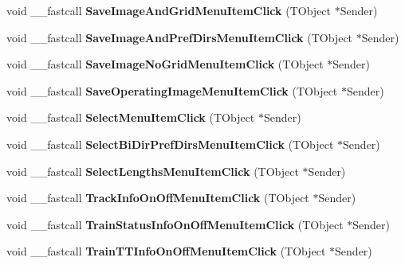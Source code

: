 \begin{DoxyCompactItemize}
void \+\_\+\+\_\+fastcall {\bfseries Save\+Image\+And\+Grid\+Menu\+Item\+Click} (T\+Object $\ast$Sender)
\item 
\mbox{\label{class_t_interface_ab73377784e302350bcc4f1fed4f8d90a}} 
void \+\_\+\+\_\+fastcall {\bfseries Save\+Image\+And\+Pref\+Dirs\+Menu\+Item\+Click} (T\+Object $\ast$Sender)
\item 
\mbox{\label{class_t_interface_a69b645fe4cc36d0bea7de3fca553bd6a}} 
void \+\_\+\+\_\+fastcall {\bfseries Save\+Image\+No\+Grid\+Menu\+Item\+Click} (T\+Object $\ast$Sender)
\item 
\mbox{\label{class_t_interface_a4d75015545313004ffd5022c020f4edf}} 
void \+\_\+\+\_\+fastcall {\bfseries Save\+Operating\+Image\+Menu\+Item\+Click} (T\+Object $\ast$Sender)
\item 
\mbox{\label{class_t_interface_a6a0ecdd864e40a84b833014d4478d1e3}} 
void \+\_\+\+\_\+fastcall {\bfseries Select\+Menu\+Item\+Click} (T\+Object $\ast$Sender)
\item 
\mbox{\label{class_t_interface_a8ed3d3631b2d3235f1e011d595909eec}} 
void \+\_\+\+\_\+fastcall {\bfseries Select\+Bi\+Dir\+Pref\+Dirs\+Menu\+Item\+Click} (T\+Object $\ast$Sender)
\item 
\mbox{\label{class_t_interface_a60bb5e1b59c75a6ce602cded9e406249}} 
void \+\_\+\+\_\+fastcall {\bfseries Select\+Lengths\+Menu\+Item\+Click} (T\+Object $\ast$Sender)
\item 
\mbox{\label{class_t_interface_aa632441a0d33482eea24ae419a5bbf78}} 
void \+\_\+\+\_\+fastcall {\bfseries Track\+Info\+On\+Off\+Menu\+Item\+Click} (T\+Object $\ast$Sender)
\item 
\mbox{\label{class_t_interface_aecd6864bb750be6ce6b2ef9ac1e05db9}} 
void \+\_\+\+\_\+fastcall {\bfseries Train\+Status\+Info\+On\+Off\+Menu\+Item\+Click} (T\+Object $\ast$Sender)
\item 
\mbox{\label{class_t_interface_a7ced2edb8afc2ee7c58b11f0dfdac079}} 
void \+\_\+\+\_\+fastcall {\bfseries Train\+T\+T\+Info\+On\+Off\+Menu\+Item\+Click} (T\+Object $\ast$Sender)

\end{DoxyCompactItemize}
